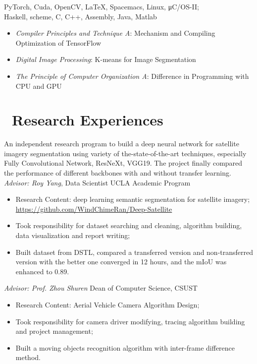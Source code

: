 \documentclass{resume}
\begin{document}
 PyTorch, Cuda, OpenCV, LaTeX, Spacemacs, Linux, μC/OS-II; \\
 Haskell, scheme, C, C++, Assembly, Java, Matlab
 
 \begin{itemize}
   \item \textit{Compiler Principles and Technique A}: Mechanism and Compiling
     Optimization of TensorFlow
   \item \textit{Digital Image Processing}: K-means for Image Segmentation
   \item \textit{The Principle of Computer Organization A}: Difference in Programming
     with CPU and GPU
 \end{itemize}
\section{\faLightbulbO\ Research Experiences}

An independent research program to build a deep neural network for satellite
imagery segmentation using variety of the-state-of-the-art techniques, especially Fully Convolutional Network, ResNeXt,
VGG19. The project finally compared the performance of different backbones with
and without transfer learning.
\\ 
\textit{Advisor: Roy Yang}, Data Scientist \hfill{UCLA Academic Program}
\begin{itemize}
 \item Research Content: deep learning semantic segmentation for satellite
   imagery; \\
   {\url{https://github.com/WindChimeRan/Deep-Satellite}}
 \item Took responsibility for dataset searching and cleaning, algorithm building, data
visualization and report writing;
  \item Built dataset from DSTL, compared a transferred version and
    non-transferred version with the better one converged in 12 hours, and the
    mIoU was enhanced to 0.89.

\end{itemize}



\textit{Advisor: Prof. Zhou Shuren} \hfill{Dean of Computer Science, CSUST}
\begin{itemize}
 \item Research Content: Aerial Vehicle Camera Algorithm Design;
 \item Took responsibility for camera driver modifying, tracing algorithm building and
project management;
 \item Built a moving objects recognition algorithm with inter-frame difference method.


\end{itemize}
\end{document}
